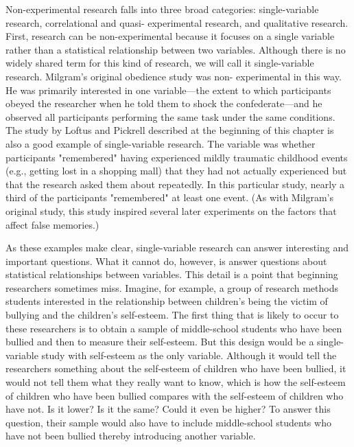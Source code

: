 Non-experimental research falls into three broad categories: single-variable research, correlational and quasi- experimental research, and qualitative research. First, research can be non-experimental because it focuses on a single variable rather than a statistical relationship between two variables. Although there is no widely shared term for this kind of research, we will call it single-variable research. Milgram's original obedience study was non- experimental in this way. He was primarily interested in one variable---the extent to which participants obeyed the researcher when he told them to shock the confederate---and he observed all participants performing the same task under the same conditions. The study by Loftus and Pickrell described at the beginning of this chapter is also a good example of single-variable research. The variable was whether participants "remembered" having experienced mildly traumatic childhood events (e.g., getting lost in a shopping mall) that they had not actually experienced but that the research asked them about repeatedly. In this particular study, nearly a third of the participants "remembered" at least one event. (As with Milgram's original study, this study inspired several later experiments on the factors that affect false memories.)

As these examples make clear, single-variable research can answer interesting and important questions. What it cannot do, however, is answer questions about statistical relationships between variables. This detail is a point that beginning researchers sometimes miss. Imagine, for example, a group of research methods students interested in the relationship between children's being the victim of bullying and the children's self-esteem. The first thing that is likely to occur to these researchers is to obtain a sample of middle-school students who have been bullied and then to measure their self-esteem. But this design would be a single-variable study with self-esteem as the only variable. Although it would tell the researchers something about the self-esteem of children who have been bullied, it would not tell them what they really want to know, which is how the self-esteem of children who have been bullied compares with the self-esteem of children who have not. Is it lower? Is it the same? Could it even be higher? To answer this question, their sample would also have to include middle-school students who have not been bullied thereby introducing another variable.

